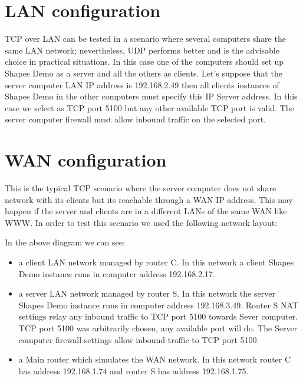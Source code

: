 \documentclass[letterpaper,10pt,english]{sphinxmanual}
\begin{document}
\section{LAN configuration}
\label{\detokenize{tcp_LAN_WAN_transport:lan-configuration}}
TCP over LAN can be tested in a scenario where several computers share the same LAN network; nevertheless, UDP performs better and is the advisable choice in practical situations. In this case one of the computers should set up Shapes Demo as a server and all the others as clients. Let’s suppose that the server computer LAN IP address is 192.168.2.49 then all clients instances of Shapes Demo in the other computers must specify this IP Server address. In this case we select as TCP port 5100 but any other available TCP port is valid. The server computer firewall must allow inbound traffic on the selected port.



\section{WAN configuration}
\label{\detokenize{tcp_LAN_WAN_transport:wan-configuration}}
This is the typical TCP scenario where the server computer does not share network with its clients but its reachable through a WAN IP address. This may happen if the server and clients are in a different LANs of the same WAN like WWW. In order to test this scenario we used the following network layout:


In the above diagram we can see:
\begin{itemize}
\item {} 
a client LAN network managed by router C. In this network a client Shapes Demo instance runs in computer address 192.168.2.17.

\item {} 
a server LAN network managed by router S. In this network the server Shapes Demo instance runs in computer address 192.168.3.49. Router S NAT settings relay any inbound traffic to TCP port 5100 towards Sever computer. TCP port 5100 was arbitrarily chosen, any available port will do. The Server computer firewall settings allow inbound traffic to TCP port 5100.

\item {} 
a Main router which simulates the WAN network. In this network router C has address 192.168.1.74 and router S has address 192.168.1.75.

\end{itemize}
\end{document}
